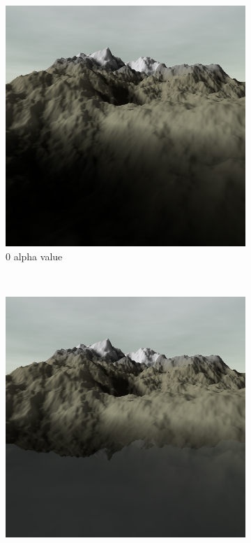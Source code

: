 \documentclass{article}
\begin{document}
\begin{figure}[H]
\centering
    \begin{subfigure}[b]{0.45\textwidth}
        \centering
        \includegraphics[scale=0.25]{waterAlpha0}
        \caption{0 alpha value}
        \label{fig:waterAlpha0}
    \end{subfigure}
    ~
    \begin{subfigure}[b]{0.45\textwidth}
        \centering
        \includegraphics[scale=0.25]{waterAlpha005}

\end{subfigure}
\end{figure}
\end{document}
